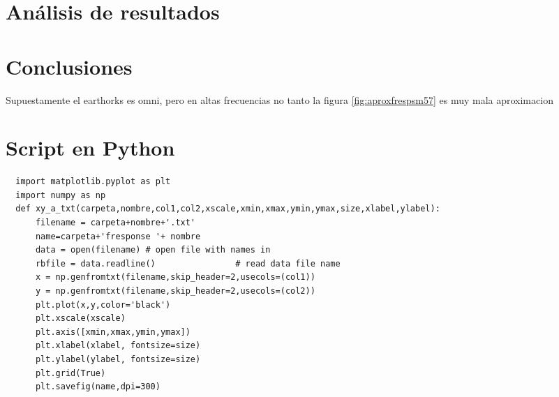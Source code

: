 \documentclass[]{article}
\begin{document}
\begin{multicols}{2}
\section{Análisis de resultados}

\lipsum[1]

\lipsum[2]

\section{Conclusiones}
\lipsum[1]

\lipsum[2]
Supuestamente el earthorks es omni, pero en altas frecuencias no tanto
la figura \ref{fig:aproxfrespsm57} es muy mala aproximacion
\printbibliography

\end{multicols}

\newpage
\appendix
\section{Script en Python}
\begin{verbatim}
  import matplotlib.pyplot as plt
  import numpy as np
  def xy_a_txt(carpeta,nombre,col1,col2,xscale,xmin,xmax,ymin,ymax,size,xlabel,ylabel):
      filename = carpeta+nombre+'.txt'
      name=carpeta+'fresponse '+ nombre
      data = open(filename) # open file with names in
      rbfile = data.readline()                # read data file name
      x = np.genfromtxt(filename,skip_header=2,usecols=(col1))
      y = np.genfromtxt(filename,skip_header=2,usecols=(col2))
      plt.plot(x,y,color='black')
      plt.xscale(xscale)
      plt.axis([xmin,xmax,ymin,ymax])
      plt.xlabel(xlabel, fontsize=size)
      plt.ylabel(ylabel, fontsize=size)
      plt.grid(True)
      plt.savefig(name,dpi=300)

\end{verbatim}
\end{document}
